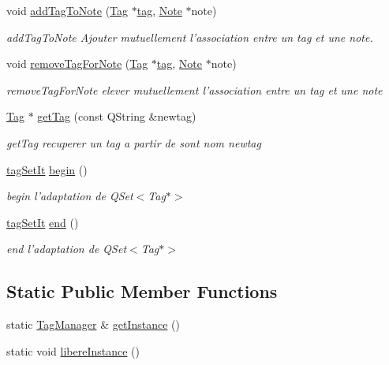\begin{DoxyCompactItemize}
void \hyperlink{class_tag_manager_a26a2ec5ee401470689d7cbfaf08c4429}{add\-Tag\-To\-Note} (\hyperlink{class_tag}{Tag} $\ast$\hyperlink{_filter_8h_a7ef0ab496f57e183b484e62e2053c94fa9daab2aa897c0d2d4500bed734b0d780}{tag}, \hyperlink{class_note}{Note} $\ast$note)
\begin{DoxyCompactList}\small\item\em add\-Tag\-To\-Note Ajouter mutuellement l'association entre un tag et une note. \end{DoxyCompactList}\item 
void \hyperlink{class_tag_manager_ab496a3ce6dddf0a551924a8791c921cb}{remove\-Tag\-For\-Note} (\hyperlink{class_tag}{Tag} $\ast$\hyperlink{_filter_8h_a7ef0ab496f57e183b484e62e2053c94fa9daab2aa897c0d2d4500bed734b0d780}{tag}, \hyperlink{class_note}{Note} $\ast$note)
\begin{DoxyCompactList}\small\item\em remove\-Tag\-For\-Note elever mutuellement l'association entre un tag et une note \end{DoxyCompactList}\item 
\hyperlink{class_tag}{Tag} $\ast$ \hyperlink{class_tag_manager_a61dbcb332f1ec7a582319da34e07af4e}{get\-Tag} (const Q\-String \&newtag)
\begin{DoxyCompactList}\small\item\em get\-Tag recuperer un tag a partir de sont nom newtag \end{DoxyCompactList}\item 
\hyperlink{_tag_manager_8h_aa1b35760a57fe696ca30f36805d822e7}{tag\-Set\-It} \hyperlink{class_tag_manager_a47aab41cb57de33c1ec857c9b6235690}{begin} ()
\begin{DoxyCompactList}\small\item\em begin l'adaptation de Q\-Set$<$\-Tag$\ast$$>$ \end{DoxyCompactList}\item 
\hyperlink{_tag_manager_8h_aa1b35760a57fe696ca30f36805d822e7}{tag\-Set\-It} \hyperlink{class_tag_manager_ae4f51bba8ed7827b0769797653b3092f}{end} ()
\begin{DoxyCompactList}\small\item\em end l'adaptation de Q\-Set$<$\-Tag$\ast$$>$ \end{DoxyCompactList}\end{DoxyCompactItemize}
\subsection*{Static Public Member Functions}
\begin{DoxyCompactItemize}
\item 
static \hyperlink{class_tag_manager}{Tag\-Manager} \& \hyperlink{class_tag_manager_ac510ba35bdfa2dce44f575ddcb3aa282}{get\-Instance} ()
\item 
static void \hyperlink{class_tag_manager_ada20145e1667ed0e767ee67dcd6a919c}{libere\-Instance} ()
\end{DoxyCompactItemize}



